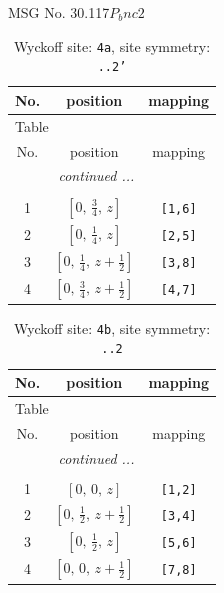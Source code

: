 \documentclass[fleqn,8pt]{jsarticle}
\begin{document}
\setcounter{MaxMatrixCols}{32}

\renewcommand{\tablename}{Table~}
\renewcommand{\figurename}{Figure~}
\begin{center}
\LARGE
MSG No. 30.117\quad$P_{b}nc2$
\end{center}
\renewcommand{\arraystretch}{1.2}
\begin{longtable}{ccc}
\caption{Wyckoff site: {\tt 4a}, site symmetry: {\tt ..2'}}
 \\
 \hline \hline
No. & position & mapping \\ \hline \endfirsthead

\multicolumn{2}{l}{\tablename\ \thetable{}} \\
 \hline \hline
No. & position & mapping \\ \hline \endhead

 \hline \hline
\multicolumn{2}{r}{\footnotesize\it continued ...} \\ \endfoot

 \hline \hline
\multicolumn{2}{r}{} \\ \endlastfoot

1 & $\left[ 0,\, \frac{3}{4},\, z \right]$ & {\tt [1,6]} \\ \hline
2 & $\left[ 0,\, \frac{1}{4},\, z \right]$ & {\tt [2,5]} \\ \hline
3 & $\left[ 0,\, \frac{1}{4},\, z + \frac{1}{2} \right]$ & {\tt [3,8]} \\ \hline
4 & $\left[ 0,\, \frac{3}{4},\, z + \frac{1}{2} \right]$ & {\tt [4,7]} \\
\end{longtable}
\renewcommand{\arraystretch}{1.2}
\begin{longtable}{ccc}
\caption{Wyckoff site: {\tt 4b}, site symmetry: {\tt ..2}}
 \\
 \hline \hline
No. & position & mapping \\ \hline \endfirsthead

\multicolumn{2}{l}{\tablename\ \thetable{}} \\
 \hline \hline
No. & position & mapping \\ \hline \endhead

 \hline \hline
\multicolumn{2}{r}{\footnotesize\it continued ...} \\ \endfoot

 \hline \hline
\multicolumn{2}{r}{} \\ \endlastfoot

1 & $\left[ 0,\, 0,\, z \right]$ & {\tt [1,2]} \\ \hline
2 & $\left[ 0,\, \frac{1}{2},\, z + \frac{1}{2} \right]$ & {\tt [3,4]} \\ \hline
3 & $\left[ 0,\, \frac{1}{2},\, z \right]$ & {\tt [5,6]} \\ \hline
4 & $\left[ 0,\, 0,\, z + \frac{1}{2} \right]$ & {\tt [7,8]} \\
\end{longtable}
\end{document}
